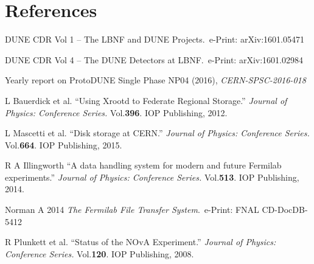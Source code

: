\documentclass[a4paper]{jpconf}
\begin{document}
\section*{References}
\begin{thebibliography}{9}

 DUNE CDR Vol 1 -- The LBNF and DUNE Projects.~e-Print: arXiv:1601.05471 

 DUNE CDR Vol 4 -- The DUNE Detectors at LBNF.~e-Print: arXiv:1601.02984

Yearly report on ProtoDUNE Single Phase NP04 (2016), \textit{CERN-SPSC-2016-018}

L Bauerdick et al. ``Using Xrootd to Federate Regional Storage.'' \textit{Journal of Physics: Conference Series.} Vol.\textbf{396}. IOP Publishing, 2012.



 L Mascetti et al. ``Disk storage at CERN.'' \textit{Journal of Physics: Conference Series.} Vol.\textbf{664}. IOP Publishing, 2015.



R A Illingworth ``A data handling system for modern and future Fermilab experiments.''  \textit{Journal of Physics: Conference Series.} Vol.\textbf{513}. IOP Publishing, 2014.


Norman A 2014 \textit{The Fermilab File Transfer System}.~e-Print: FNAL CD-DocDB-5412

R Plunkett et al.  ``Status of the NOvA Experiment.''  \textit{Journal of Physics: Conference Series.} Vol.\textbf{120}. IOP Publishing, 2008.



\end{thebibliography}
\end{document}
